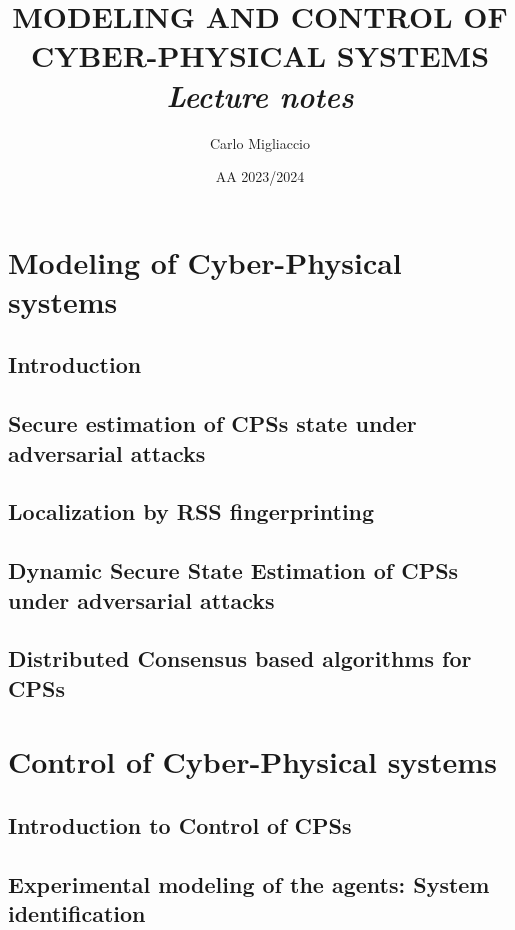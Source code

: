 \documentclass[a4paper, 12pt]{report}
\title{
    \textbf{  \Huge{  MODELING AND  CONTROL OF\\ 
    CYBER-PHYSICAL SYSTEMS } }\\
    \textit{Lecture notes}
}
\author{Carlo Migliaccio}
\date{AA 2023/2024}
\begin{document}
\maketitle
\tableofcontents

\part{Modeling of Cyber-Physical systems}
\chapter{Introduction}


\chapter{Secure estimation of CPSs state under adversarial attacks}


\chapter{Localization by RSS fingerprinting}


\chapter {Dynamic Secure State Estimation of CPSs under adversarial attacks}


\chapter{Distributed Consensus based algorithms for CPSs}



\part{Control of Cyber-Physical systems}
\chapter{Introduction to Control of CPSs}


\chapter{Experimental modeling of the agents: System identification}

\end{document}
